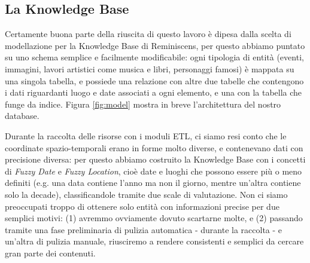 \documentclass[sigproc-sp.tex]{subfiles}
\begin{document}
\subsection{La Knowledge Base}
Certamente buona parte della riuscita di questo lavoro è dipesa dalla scelta di modellazione per la Knowledge Base di Reminiscens, per questo abbiamo puntato su uno schema semplice e facilmente modificabile: ogni tipologia di entità (eventi, immagini, lavori artistici come musica e libri, personaggi famosi) è mappata su una singola tabella, e possiede una relazione con altre due tabelle che contengono i dati riguardanti luogo e date associati a ogni elemento, e una con la tabella che funge da indice. Figura \ref{fig:model} mostra in breve l'architettura del nostro database.

Durante la raccolta delle risorse con i moduli ETL, ci siamo resi conto che le coordinate spazio-temporali erano in forme molto diverse, e contenevano dati con precisione diversa: per questo abbiamo costruito la Knowledge Base con i concetti di \textit{Fuzzy Date} e \textit{Fuzzy Location}, cioè date e luoghi che possono essere più o meno definiti (e.g. una data contiene l'anno ma non il giorno, mentre un'altra contiene solo la decade), classificandole tramite due scale di valutazione. Non ci siamo preoccupati troppo di ottenere solo entità con informazioni precise per due semplici motivi: (1) avremmo ovviamente dovuto scartarne molte, e (2) passando tramite una fase preliminaria di pulizia automatica - durante la raccolta - e un'altra di pulizia manuale, riusciremo a rendere consistenti e semplici da cercare gran parte dei contenuti.
\end{document}
